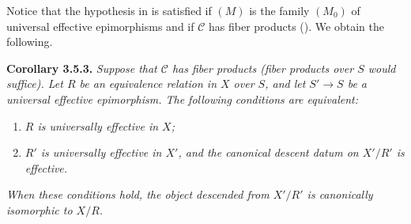 Notice that the hypothesis in  is satisfied if \((M)\) is
the family \((M_0)\) of universal effective epimorphisms and if
\(\mathscr C\) has fiber products (). We obtain the following.

\medskip
\noindent{}\textbf{Corollary 3.5.3.}
\textit{Suppose that \(\mathscr C\) has fiber products (fiber products over
\(S\) would suffice). Let \(R\) be an equivalence relation in \(X\) over
\(S\), and let \(S'\to S\) be a universal effective epimorphism. The
following conditions are equivalent:}
\begin{enumerate}
  \item[(i)] \textit{\(R\) is universally effective in \(X\);}
  \item[(ii)] \textit{\(R'\) is universally effective in \(X'\), and the
  canonical descent datum on \(X'/R'\) is effective.}
\end{enumerate}
\textit{When these conditions hold, the object descended from \(X'/R'\) is
canonically isomorphic to \(X/R\).}

